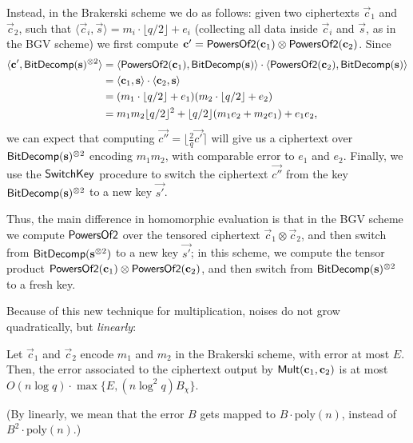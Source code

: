         Instead, in the Brakerski scheme we do as follows: given two ciphertexts $\vec{c}_1$ and $\vec{c}_2$, such that $\langle \vec{c}_i, \vec{s} \rangle = m_i \cdot \lfloor q / 2 \rfloor + e_i$ (collecting all data inside $\vec{c}_i$ and $\vec{s}$, as in the BGV scheme) we first compute $\vec{c'} = {\sf PowersOf2}(\vec{c}_1) \otimes {\sf PowersOf2}(\vec{c}_2)$. Since
        \begin{align*}
            \langle \vec{c'}, {\sf BitDecomp}(\vec{s})^{\otimes 2} \rangle &= \langle {\sf PowersOf2}(\vec{c}_1), {\sf BitDecomp}(\vec{s}) \rangle \cdot \langle {\sf PowersOf2}(\vec{c}_2), {\sf BitDecomp}(\vec{s}) \rangle \\
            &= \langle \vec{c}_1, \vec{s} \rangle \cdot \langle \vec{c}_2, \vec{s} \rangle \\
            &= (m_1 \cdot \lfloor q / 2 \rfloor + e_1)(m_2 \cdot \lfloor q / 2 \rfloor + e_2) \\
            &= m_1 m_2 \lfloor q / 2 \rfloor^2 + \lfloor q / 2 \rfloor (m_1 e_2 + m_2 e_1) + e_1 e_2,
        \end{align*}
        we can expect that computing $\vec{c''} = \lfloor \frac{2}{q} \vec{c'} \rceil$ will give us a ciphertext over ${\sf BitDecomp}(\vec{s})^{\otimes 2}$ encoding $m_1 m_2$, with comparable error to $e_1$ and $e_2$. Finally, we use the ${\sf SwitchKey}$ procedure to switch the ciphertext $\vec{c''}$ from the key ${\sf BitDecomp}(\vec{s})^{\otimes 2}$ to a new key $\vec{s'}$.

        Thus, the main difference in homomorphic evaluation is that in the BGV scheme we compute ${\sf PowersOf2}$ over the tensored ciphertext $\vec{c}_1 \otimes \vec{c}_2$, and then switch from ${\sf BitDecomp}(\vec{s}^{\otimes 2})$ to a new key $\vec{s'}$; in this scheme, we compute the tensor product ${\sf PowersOf2}(\vec{c}_1) \otimes {\sf PowersOf2}(\vec{c}_2)$, and then switch from ${\sf BitDecomp}(\vec{s})^{\otimes 2}$ to a fresh key.

        Because of this new technique for multiplication, noises do not grow quadratically, but \emph{linearly}:
        \begin{lemma}
            Let $\vec{c}_1$ and $\vec{c}_2$ encode $m_1$ and $m_2$ in the Brakerski scheme, with error at most $E$. Then, the error associated to the ciphertext output by ${\sf Mult}(\vec{c}_1, \vec{c}_2)$ is at most $O(n \log q) \cdot \max \{E, (n \log^2 q)B_\chi\}$.
        \end{lemma}

        (By linearly, we mean that the error $B$ gets mapped to $B \cdot \text{poly}(n)$, instead of $B^2 \cdot \text{poly}(n)$.)

